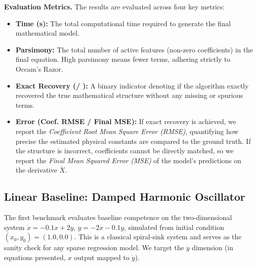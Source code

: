 \documentclass[11pt, a4paper]{article}
\begin{document}
\vspace{0.3cm}
\noindent \textbf{Evaluation Metrics.} The results are evaluated across four key metrics:
\begin{itemize}
    \item \textbf{Time (s):} The total computational time required to generate the final mathematical model.
    \item \textbf{Parsimony:} The total number of active features (non-zero coefficients) in the final equation. High parsimony means fewer terms, adhering strictly to Occam's Razor.
    \item \textbf{Exact Recovery (\checkmark / \texttimes):} A binary indicator denoting if the algorithm exactly recovered the true mathematical structure without any missing or spurious terms.
    \item \textbf{Error (Coef. RMSE / Final MSE):} If exact recovery is achieved, we report the \emph{Coefficient Root Mean Square Error (RMSE)}, quantifying how precise the estimated physical constants are compared to the ground truth. If the structure is incorrect, coefficients cannot be directly matched, so we report the \emph{Final Mean Squared Error (MSE)} of the model's predictions on the derivative $\dot{X}$. 
\end{itemize}

\subsection{Linear Baseline: Damped Harmonic Oscillator}

The first benchmark evaluates baseline competence on the two-dimensional system $\dot{x} = -0.1x + 2y$, $\dot{y} = -2x - 0.1y$, simulated from initial condition $(x_0, y_0) = (1.0, 0.0)$. This is a classical spiral-sink system and serves as the sanity check for any sparse regression model. We target the $\dot{y}$ dimension (in equations presented, $x$ output mapped to $\dot{y}$).
\end{document}
